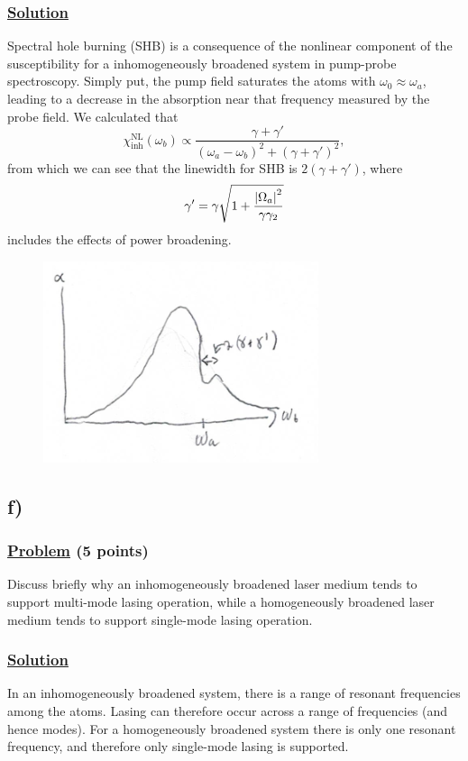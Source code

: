 \documentclass[12pt]{article}
\begin{document}
\subsubsection*{\underline{Solution}}
Spectral hole burning (SHB) is a consequence of the nonlinear component of the susceptibility for a inhomogeneously broadened system in pump-probe spectroscopy. 
Simply put, the pump field saturates the atoms with $\omega_0 \approx \omega_a$, leading to a decrease in the absorption near that frequency measured by the probe field.
We calculated that
\[ \chi_\text{inh}^\text{NL}(\omega_b) \propto \frac{\gamma + \gamma'}{(\omega_a-\omega_b)^2 + (\gamma + \gamma')^2}, \]
from which we can see that the linewidth for SHB is $2(\gamma + \gamma')$, where
\[ \gamma' = \gamma\sqrt{1 + \frac{\abs{\Omega_a}^2}{\gamma\gamma_2}} \]
includes the effects of power broadening.
\begin{figure}[h]
    \centering
    \includegraphics[scale=1.5]{1e.png}
\end{figure}

\subsection*{f)}
\subsubsection*{\underline{Problem} (5 points)}
Discuss briefly why an inhomogeneously broadened laser medium tends to support multi-mode lasing operation, while a homogeneously broadened laser medium tends to support single-mode lasing operation.

\subsubsection*{\underline{Solution}}
In an inhomogeneously broadened system, there is a range of resonant frequencies among the atoms. Lasing can therefore occur across a range of frequencies (and hence modes).
For a homogeneously broadened system there is only one resonant frequency, and therefore only single-mode lasing is supported.
\end{document}
